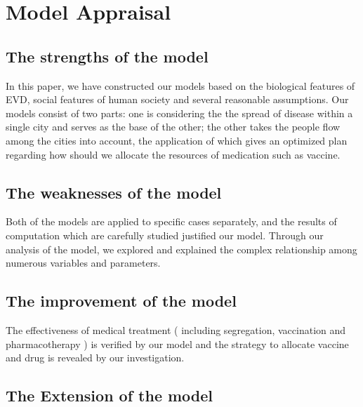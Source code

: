 \section{Model Appraisal}

\subsection{The strengths of the model}
In this paper, we have constructed our models based on the biological features of EVD, social features of human society and several reasonable assumptions. Our models consist of two parts: one is considering the the spread of disease within a single city and serves as the base of the other; the other takes the people flow among the cities into account, the application of which gives an optimized plan regarding how should we allocate the resources of medication such as vaccine.

\subsection{The weaknesses of the model}

Both of the models are applied to specific cases separately, and the results of computation which are carefully studied justified our model. Through our analysis of the model, we explored and explained the complex relationship among numerous variables and parameters.

\subsection{The improvement of the model}
The effectiveness of medical treatment ( including segregation, vaccination and pharmacotherapy ) is verified by our model and the strategy to allocate vaccine and drug is revealed by our investigation.

\subsection{The Extension of the model}